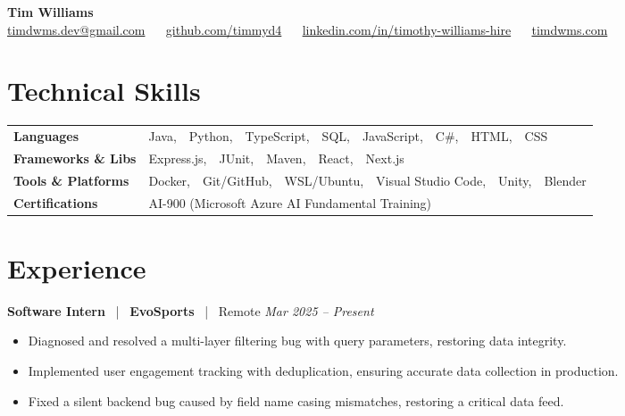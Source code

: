 \documentclass[10pt, letterpaper]{article}
\newcommand{\jobhead}[4]{%
  \vspace{5pt}%
  {\bfseries\color{dark}#1}%
  ~{\color{light}|}~%
  {\bfseries\color{navy}#2}%
  ~{\color{light}|}~%
  {\color{light}#3}%
  \hfill{\color{light}\small\textit{#4}}\\[-2pt]%
}
\newcommand{\skillrow}[2]{%
  {\bfseries #1} & #2 \\[2pt]%
}
\begin{document}

\begin{center}
  {\huge\bfseries\color{navy} Tim Williams}\\[4pt]
  {\small\color{light}
    \href{mailto:timdwms.dev@gmail.com}{timdwms.dev@gmail.com}
    ~\textbullet~
    \href{https://github.com/timmyd4}{github.com/timmyd4}
    ~\textbullet~
    \href{https://www.linkedin.com/in/timothy-williams-hire}{linkedin.com/in/timothy-williams-hire}
    ~\textbullet~
    \href{https://timdwms.com}{timdwms.com}
  }
\end{center}

\vspace{2pt}

\section{Technical Skills}

\begin{tabular}{@{}p{1.6in} p{5.2in}@{}}
  \skillrow{Languages}{Java,\ \ Python,\ \ TypeScript,\ \ SQL,\ \ JavaScript,\ \ C\#,\ \ HTML,\ \ CSS}
  \skillrow{Frameworks \& Libs}{Express.js,\ \ JUnit,\ \ Maven,\ \ React,\ \ Next.js}
  \skillrow{Tools \& Platforms}{Docker,\ \ Git/GitHub,\ \ WSL/Ubuntu,\ \ Visual Studio Code,\ \ Unity,\ \ Blender}
  \skillrow{Certifications}{AI-900 (Microsoft Azure AI Fundamental Training)}
\end{tabular}

\section{Experience}

\jobhead{Software Intern}{EvoSports}{Remote}{Mar 2025 – Present}
\begin{itemize}
  \item Diagnosed and resolved a multi-layer filtering bug with query parameters, restoring data integrity.
  \item Implemented user engagement tracking with deduplication, ensuring accurate data collection in production.
  \item Fixed a silent backend bug caused by field name casing mismatches, restoring a critical data feed.
\end{itemize}
\end{document}
